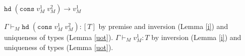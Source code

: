 \begin{case}
$\mathtt{hd}\;(\mathtt{cons}\;v_{M}^{1}\;v_{M}^{2})\rightarrow v_{M}^{1}$

$\Gamma\vdash_{M}\mathtt{hd}\;(\mathtt{cons}\;v_{M}^{1}\;v_{M}^{2}):[T]$ by premise and inversion (Lemma \ref{i}) and uniqueness of types (Lemma \ref{uot}).  $\Gamma\vdash_{M}v_{M}^{1}:T$ by inversion (Lemma \ref{i}) and uniqueness of types (Lemma \ref{uot}).
\end{case}